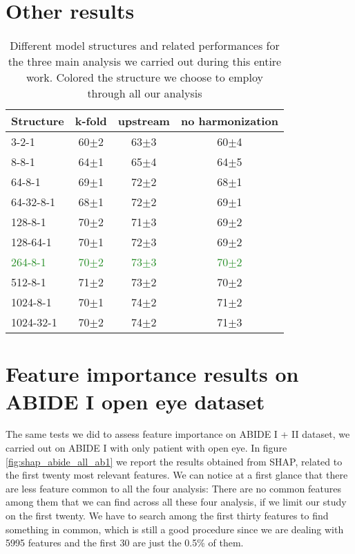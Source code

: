 \documentclass[11pt]{report}
\begin{document}
\section{Other results}


\begin{table}[!htp]\centering
\begin{tabular}{lccc}
\toprule
Structure &k-fold &upstream &no harmonization \\
\midrule
3-2-1 &60$\pm$2 &63$\pm$3 &60$\pm$4 \\
8-8-1 &64$\pm$1 &65$\pm$4 &64$\pm$5 \\
64-8-1 &69$\pm$1 &72$\pm$2 &68$\pm$1 \\
64-32-8-1 &68$\pm$1 &72$\pm$2 &69$\pm$1 \\
128-8-1 &70$\pm$2 &71$\pm$3 &69$\pm$2 \\
128-64-1 &70$\pm$1 &72$\pm$3 &69$\pm$2 \\
\textcolor{ForestGreen}{264-8-1}&\textcolor{ForestGreen}{70$\pm$2} & \textcolor{ForestGreen}{73$\pm$3} & \textcolor{ForestGreen}{70$\pm$2} \\
512-8-1 &71$\pm$2 &73$\pm$2 &70$\pm$2 \\
1024-8-1 &70$\pm$1 &74$\pm$2 &71$\pm$2 \\
1024-32-1 &70$\pm$2 &74$\pm$2 &71$\pm$3 \\
\bottomrule
\end{tabular}
\caption{Different model structures and related performances for the three main analysis we carried out during this entire work. Colored the structure we choose to employ through all our analysis}\label{tab:different_model_structures}
\end{table}

\section{Feature importance results on ABIDE I open eye dataset}

The same tests we did to assess feature importance on ABIDE I + II dataset, we carried out on ABIDE I with only patient with open eye.
In figure \ref{fig:shap_abide_all_ab1} we report the results obtained from SHAP, related to the first twenty most relevant features.
We can notice at a first glance that there are less feature common to all the four analysis:
There are no common features among them that we can find across all these four analysis, if we limit our study on the first twenty.
We have to search among the first thirty features to find something in common, which is still a good procedure since we are dealing with 5995 features and the first 30 are just the 0.5\% of them.
\end{document}
